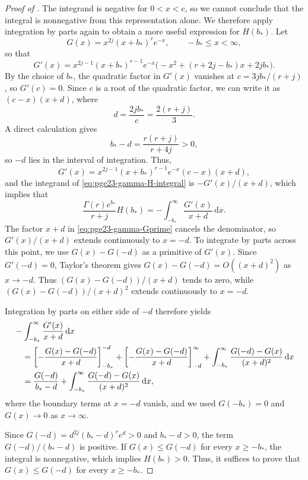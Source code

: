 \documentclass[11pt]{article}
\theoremstyle{remark}
\numberwithin{equation}{section}
\newcommand{\dd}{\,\mathrm d}
\begin{document}
\begin{proof}[Proof of ]
  The integrand is negative for $0<x<c$, so we cannot conclude that the
  integral is nonnegative from this representation alone.
  We therefore apply integration by parts again to obtain a more useful
  expression for $H(b_*)$. Let
  \begin{equation*}
    G(x)=x^{2j}(x+b_*)^re^{-x},
    \qquad -b_*\le x<\infty,
  \end{equation*}
  so that
  \[
    G'(x)=x^{2j-1}(x+b_*)^{r-1}e^{-x}
    \bigl(-x^2+(r+2j-b_*)x+2jb_*\bigr).
  \]
  By the choice of $b_*$, the quadratic factor in $G'(x)$ vanishes at
  $c=3jb_*/(r+j)$, so $G'(c)=0$.
  Since $c$ is a root of the quadratic factor, we can write it as
  $(c-x)(x+d)$, where
  \[
    d=\frac{2jb_*}{c}=\frac{2(r+j)}{3}.
  \]
  A direct calculation gives
  \[
    b_*-d=\frac{r(r+j)}{r+4j}>0,
  \]
  so $-d$ lies in the interval of integration.
  Thus,
  \begin{equation}\label{eq:pge23-gamma-Gprime}
    G'(x)=x^{2j-1}(x+b_*)^{r-1}e^{-x}(c-x)(x+d),
  \end{equation}
  and the integrand of \eqref{eq:pge23-gamma-H-integral} is $-G'(x)/(x+d)$, which implies that 
  \[
    \frac{\Gamma(r)e^{b_*}}{r+j}H(b_*)
    =-\int_{-b_*}^{\infty}\frac{G'(x)}{x+d}\dd x.
  \]
  The factor $x+d$ in \eqref{eq:pge23-gamma-Gprime} cancels the denominator,
  so $G'(x)/(x+d)$ extends continuously to $x=-d$.
  To integrate by parts across this point, we use $G(x)-G(-d)$ as a
  primitive of $G'(x)$. Since $G'(-d)=0$, Taylor's theorem gives
  $G(x)-G(-d)=O((x+d)^2)$ as $x\to-d$. Thus
  $(G(x)-G(-d))/(x+d)$ tends to zero, while
  $(G(x)-G(-d))/(x+d)^2$ extends continuously to $x=-d$.

  Integration by parts on either side of $-d$ therefore yields
  \begin{align}
    &-\int_{-b_*}^{\infty}\frac{G'(x)}{x+d}\dd x\notag\\
    &\quad=\left[-\frac{G(x)-G(-d)}{x+d}\right]_{-b_*}^{-d}
    +\left[-\frac{G(x)-G(-d)}{x+d}\right]_{-d}^{\infty}
    +\int_{-b_*}^{\infty}\frac{G(-d)-G(x)}{(x+d)^2}\dd x\notag\\
    &\quad=\frac{G(-d)}{b_*-d}
    +\int_{-b_*}^{\infty}\frac{G(-d)-G(x)}{(x+d)^2}\dd x,
    \label{eq:pge23-gamma-ibp-max}
  \end{align}
  where the boundary terms at $x=-d$ vanish, and we used
  $G(-b_*)=0$ and $G(x)\to0$ as $x\to\infty$.

  Since $G(-d)=d^{2j}(b_*-d)^re^{d}>0$ and $b_*-d>0$, the term
  $G(-d)/(b_*-d)$ is positive. If $G(x)\le G(-d)$ for every
  $x\ge-b_*$, the integral is nonnegative, which implies $H(b_*)>0$.
  Thus, it suffices to prove that $G(x)\le G(-d)$ for every $x\ge-b_*$.


\end{proof}
\end{document}
